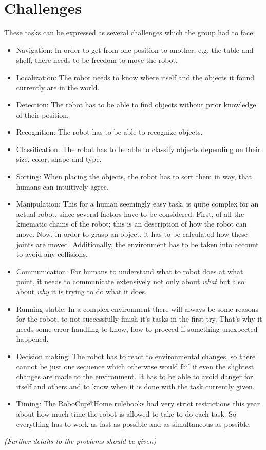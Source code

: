 \documentclass[main.tex]{subfiles}
\begin{document}
	\section{Challenges} 
	These tasks can be expressed as several challenges which the group had to face:
	\begin{itemize}
		\item Navigation: In order to get from one position to another, e.g. the table and shelf, there needs to be freedom to move the robot. 
		\item Localization: The robot needs to know where itself and the objects it found currently are in the world.
		\item Detection: The robot has to be able to find objects without prior knowledge of their position.
		\item Recognition: The robot has to be able to recognize objects.
		\item Classification: The robot has to be able to classify objects depending on their size, color, shape and type.
		\item Sorting: When placing the objects, the robot has to sort them in way, that humans can intuitively agree.
		\item Manipulation: This for a human seemingly easy task, is quite complex for an actual robot, since several factors have to be considered. First, of all the kinematic chains of the robot; this is an description of how the robot can move. Now, in order to grasp an object, it has to be calculated how these joints are moved. Additionally, the environment has to be taken into account to avoid any collisions.
		\item Communication: For humans to understand what to robot does at what point, it needs to communicate extensively not only about \textit{what} but also about \textit{why} it is trying to do what it does.
		\item Running stable: In a complex environment there will always be some reasons for the robot, to not successfully finish it's tasks in the first try. That's why it needs some error handling to know, how to proceed if something unexpected happened.
		\item Decision making: The robot has to react to environmental changes, so there cannot be just one sequence which otherwise would fail if even the slightest changes are made to the environment. It has to be able to avoid danger for itself and others and to know when it is done with the task currently given.
		\item Timing: The RoboCup@Home rulebooks had very strict restrictions this year about how much time the robot is allowed to take to do each task. So everything has to work as fast as possible and as simultaneous as possible.
		
	\end{itemize}
	
	\textit{(Further details to the problems should be given)}	
	
\end{document}
